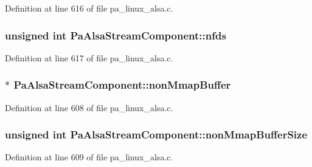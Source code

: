 Definition at line 616 of file pa\+\_\+linux\+\_\+alsa.\+c.

\subsubsection[{\texorpdfstring{nfds}{nfds}}]{\setlength{\rightskip}{0pt plus 5cm}unsigned {\bf int} Pa\+Alsa\+Stream\+Component\+::nfds}\hypertarget{struct_pa_alsa_stream_component_a718de0ee2c66d4a7c3185742db0082ba}{}\label{struct_pa_alsa_stream_component_a718de0ee2c66d4a7c3185742db0082ba}


Definition at line 617 of file pa\+\_\+linux\+\_\+alsa.\+c.

\subsubsection[{\texorpdfstring{non\+Mmap\+Buffer}{nonMmapBuffer}}]{$\ast$ Pa\+Alsa\+Stream\+Component\+::non\+Mmap\+Buffer}\hypertarget{struct_pa_alsa_stream_component_af5ba1c53cd31f35d1474aa5575200450}{}\label{struct_pa_alsa_stream_component_af5ba1c53cd31f35d1474aa5575200450}


Definition at line 608 of file pa\+\_\+linux\+\_\+alsa.\+c.

\subsubsection[{\texorpdfstring{non\+Mmap\+Buffer\+Size}{nonMmapBufferSize}}]{\setlength{\rightskip}{0pt plus 5cm}unsigned {\bf int} Pa\+Alsa\+Stream\+Component\+::non\+Mmap\+Buffer\+Size}\hypertarget{struct_pa_alsa_stream_component_aa34fb77349c23b3e10d1a588c3d8f106}{}\label{struct_pa_alsa_stream_component_aa34fb77349c23b3e10d1a588c3d8f106}


Definition at line 609 of file pa\+\_\+linux\+\_\+alsa.\+c.

